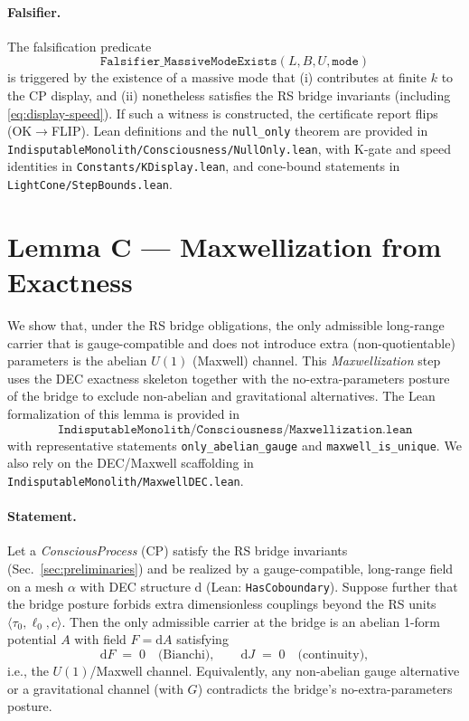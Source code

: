 \documentclass[12pt,a4paper]{article}
\begin{document}
\paragraph{Falsifier.}
The falsification predicate
\[
  \texttt{Falsifier\_MassiveModeExists}(L,B,U, \texttt{mode})
\]
is triggered by the existence of a massive mode that (i) contributes at finite \(k\) to the CP display, and (ii) nonetheless satisfies the RS bridge invariants (including \eqref{eq:display-speed}). If such a witness is constructed, the certificate report flips (OK\(\to\)FLIP). Lean definitions and the \texttt{null\_only} theorem are provided in \texttt{IndisputableMonolith/Consciousness/NullOnly.lean}, with K-gate and speed identities in \texttt{Constants/KDisplay.lean}, and cone-bound statements in \texttt{LightCone/StepBounds.lean}.

\section{Lemma C — Maxwellization from Exactness}
\label{sec:lemmaC}

We show that, under the RS bridge obligations, the only admissible long-range carrier that is gauge-compatible and does not introduce extra (non-quotientable) parameters is the abelian \(U(1)\) (Maxwell) channel. This \emph{Maxwellization} step uses the DEC exactness skeleton together with the no-extra-parameters posture of the bridge to exclude non-abelian and gravitational alternatives. The Lean formalization of this lemma is provided in
\[
  \texttt{IndisputableMonolith/Consciousness/Maxwellization.lean}
\]
with representative statements \texttt{only\_abelian\_gauge} and \texttt{maxwell\_is\_unique}. We also rely on the DEC/Maxwell scaffolding in \texttt{IndisputableMonolith/MaxwellDEC.lean}.

\paragraph{Statement.}
Let a \emph{ConsciousProcess} (CP) satisfy the RS bridge invariants (Sec.~\ref{sec:preliminaries}) and be realized by a gauge-compatible, long-range field on a mesh \(\alpha\) with DEC structure \(\mathrm{d}\) (Lean: \texttt{HasCoboundary}). Suppose further that the bridge posture forbids extra dimensionless couplings beyond the RS units \(\langle\tau_0,\ell_0,c\rangle\). Then the only admissible carrier at the bridge is an abelian 1-form potential \(A\) with field \(F=\mathrm{d}A\) satisfying
\begin{equation}
  \mathrm{d}F \;=\; 0
  \quad\text{(Bianchi)}, 
  \qquad
  \mathrm{d}J \;=\; 0
  \quad\text{(continuity)},
\end{equation}
i.e., the \(U(1)\)/Maxwell channel. Equivalently, any non-abelian gauge alternative or a gravitational channel (with \(G\)) contradicts the bridge's no-extra-parameters posture.
\end{document}
